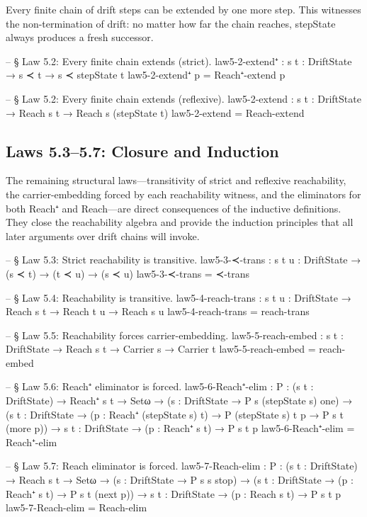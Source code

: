 \documentclass[11pt,a4paper]{book}
\def\texttt#1{#1}%
\begin{document}
Every finite chain of drift steps can be extended by one more step.
This witnesses the non-termination of drift: no matter how far the chain reaches, \texttt{stepState} always produces a fresh successor.

\begin{code}
-- § Law 5.2: Every finite chain extends (strict).
law5-2-extend⁺ :
  {s t : DriftState} →
  s ≺ t →
  s ≺ stepState t
law5-2-extend⁺ p = Reach⁺-extend p

-- § Law 5.2: Every finite chain extends (reflexive).
law5-2-extend :
  {s t : DriftState} →
  Reach s t →
  Reach s (stepState t)
law5-2-extend = Reach-extend
\end{code}

\subsection{Laws 5.3--5.7: Closure and Induction}

The remaining structural laws---transitivity of strict and reflexive reachability, the carrier-embedding forced by each reachability witness, and the eliminators for both \texttt{Reach⁺} and \texttt{Reach}---are direct consequences of the inductive definitions.
They close the reachability algebra and provide the induction principles that all later arguments over drift chains will invoke.

\begin{code}
-- § Law 5.3: Strict reachability is transitive.
law5-3-≺-trans : {s t u : DriftState} → (s ≺ t) → (t ≺ u) → (s ≺ u)
law5-3-≺-trans = ≺-trans

-- § Law 5.4: Reachability is transitive.
law5-4-reach-trans : {s t u : DriftState} → Reach s t → Reach t u → Reach s u
law5-4-reach-trans = reach-trans

-- § Law 5.5: Reachability forces carrier-embedding.
law5-5-reach-embed : {s t : DriftState} → Reach s t → Carrier s → Carrier t
law5-5-reach-embed = reach-embed

-- § Law 5.6: Reach⁺ eliminator is forced.
law5-6-Reach⁺-elim :
  {P : (s t : DriftState) → Reach⁺ s t → Setω} →
  ({s : DriftState} → P s (stepState s) one) →
  ({s t : DriftState} → (p : Reach⁺ (stepState s) t) → P (stepState s) t p → P s t (more p)) →
  {s t : DriftState} → (p : Reach⁺ s t) → P s t p
law5-6-Reach⁺-elim = Reach⁺-elim

-- § Law 5.7: Reach eliminator is forced.
law5-7-Reach-elim :
  {P : (s t : DriftState) → Reach s t → Setω} →
  ({s : DriftState} → P s s stop) →
  ({s t : DriftState} → (p : Reach⁺ s t) → P s t (next p)) →
  {s t : DriftState} → (p : Reach s t) → P s t p
law5-7-Reach-elim = Reach-elim
\end{code}
\end{document}
